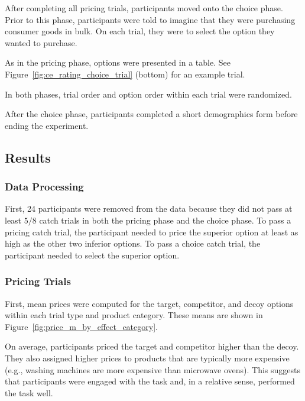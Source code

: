 After completing all pricing trials, participants moved onto the choice phase. Prior to this phase, participants were told to imagine that they were purchasing consumer goods in bulk. On each trial, they were to select the option they wanted to purchase. 

As in the pricing phase, options were presented in a table. See Figure~\ref{fig:ce_rating_choice_trial} (bottom) for an example trial.

In both phases, trial order and option order within each trial were randomized. 

After the choice phase, participants completed a short demographics form before ending the experiment. 

\subsection{Results}

\subsubsection{Data Processing}

First, 24 participants were removed from the data because they did not pass at least $5/8$ catch trials in both the pricing phase and the choice phase. To pass a pricing catch trial, the participant needed to price the superior option at least as high as the other two inferior options. To pass a choice catch trial, the participant needed to select the superior option. 

\subsubsection{Pricing Trials}

First, mean prices were computed for the target, competitor, and decoy options within each trial type and product category. These means are shown in Figure~\ref{fig:price_m_by_effect_category}.

On average, participants priced the target and competitor higher than the decoy. They also assigned higher prices to products that are typically more expensive (e.g., washing machines are more expensive than microwave ovens). This suggests that participants were engaged with the task and, in a relative sense, performed the task well.

